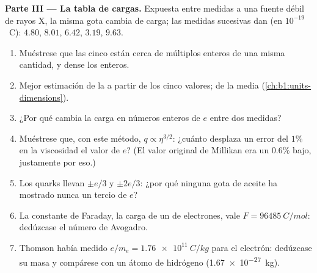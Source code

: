 \begin{problem}
\medskip
\noindent\textbf{Parte III --- La tabla de cargas.}
Expuesta entre medidas a una fuente débil de rayos X, la misma gota
cambia de carga; las medidas sucesivas dan (en $10^{-19}$~C):
$4.80$, $8.01$, $6.42$, $3.19$, $9.63$.
\begin{enumerate}[resume]
  \item Muéstrese que las cinco están cerca de múltiplos enteros de una
        misma cantidad, y dense los enteros.
  \item Mejor estimación de la  a partir de los cinco
        valores;  de la media (\cref{ch:b1:units-dimensions}).
  \item ¿Por qué cambia la carga en números enteros de $e$ entre dos
        medidas?
  \item Muéstrese que, con este método, $q \propto \eta^{3/2}$: ¿cuánto
        desplaza un error del $1\%$ en la viscosidad el valor de $e$? (El
        valor original de Millikan era un $0.6\%$ bajo, justamente por eso.)
  \item Los quarks llevan $\pm e/3$ y $\pm 2e/3$: ¿por qué ninguna gota de
        aceite ha mostrado nunca un tercio de $e$?
  \item La constante de Faraday, la carga de un  de electrones, vale
        $F = \qty{96485}{C/mol}$: dedúzcase el número de Avogadro.
  \item Thomson había medido $e/m_e = \qty{1.76e11}{C/kg}$ para el
        electrón: dedúzcase su masa y compárese con un átomo de hidrógeno
        (\qty{1.67e-27}{kg}).
\end{enumerate}


\end{problem}

